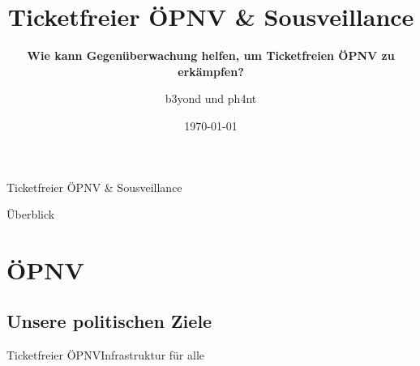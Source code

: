 \documentclass[10pt]{beamer}
\title[] %
{ %
      \textbf{Ticketfreier \"OPNV \& Sousveillance}
}
\subtitle[Ticketfreier \"OPNV \& Sousveillance]
{
      \textbf{Wie kann Gegenüberwachung helfen, um Ticketfreien ÖPNV zu erkämpfen?}
}
\author[b3yond und ph4nt]
{      b3yond und ph4nt \\
      {}
}
\institute[]
{
      Netzwerk für kybernetischen Anarchismus \& Sousveillance
  
}
\date{\today}
\begin{document}

{\1%



\begin{frame}{Ticketfreier \"OPNV \& Sousveillance}{}

\maketitle
\tableofcontents

\end{frame}

\begin{frame}{Überblick}{}

\tableofcontents

\end{frame}

\section{ÖPNV}
\subsection{Unsere politischen Ziele}
\begin{frame}{Ticketfreier ÖPNV}{Infrastruktur für alle}


\end{frame}}
\end{document}
